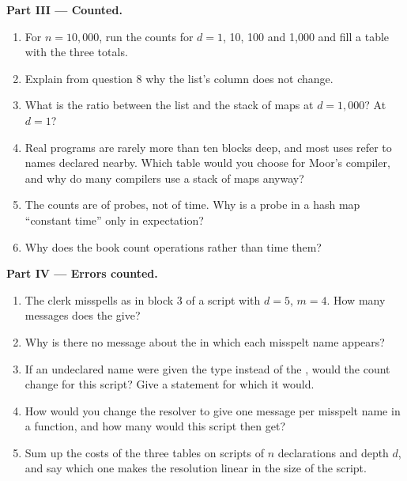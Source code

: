 \begin{problem}
\medskip\noindent\textbf{Part III --- Counted.}
\begin{enumerate}[resume]
\item For $n = 10{,}000$, run the counts for $d = 1$, 10, 100 and 1,000 and fill a table with the three totals.
\item Explain from question 8 why the list's column does not change.
\item What is the ratio between the list and the stack of maps at $d = 1{,}000$? At $d = 1$?
\item Real programs are rarely more than ten blocks deep, and most uses refer to names declared nearby. Which table would you choose for Moor's compiler, and why do many compilers use a stack of maps anyway?
\item The counts are of probes, not of time. Why is a probe in a hash map ``constant time'' only in expectation?
\item Why does the book count operations rather than time them?
\end{enumerate}

\medskip\noindent\textbf{Part IV --- Errors counted.}
\begin{enumerate}[resume]
\item The clerk misspells  as  in block 3 of a script with $d = 5$, $m = 4$. How many messages does the  give?
\item Why is there no message about the \code{+} in which each misspelt name appears?
\item If an undeclared name were given the type  instead of the , would the count change for this script? Give a statement for which it would.
\item How would you change the resolver to give one message per misspelt name in a function, and how many would this script then get?
\item Sum up the costs of the three tables on scripts of $n$ declarations and depth $d$, and say which one makes the resolution linear in the size of the script.
\end{enumerate}
\end{problem}
